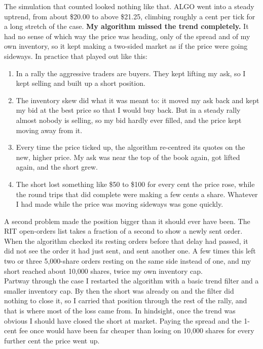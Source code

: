 \documentclass{article}
\begin{document}
\noindent The simulation that counted looked nothing like that. ALGO went into a steady uptrend, from about \$20.00 to above \$21.25, climbing roughly a cent per tick for a long stretch of the case. \textbf{My algorithm missed the trend completely.} It had no sense of which way the price was heading, only of the spread and of my own inventory, so it kept making a two-sided market as if the price were going sideways. In practice that played out like this:
\begin{enumerate}
  \item In a rally the aggressive traders are buyers. They kept lifting my ask, so I kept selling and built up a short position.
  \item The inventory skew did what it was meant to: it moved my ask back and kept my bid at the best price so that I would buy back. But in a steady rally almost nobody is selling, so my bid hardly ever filled, and the price kept moving away from it.
  \item Every time the price ticked up, the algorithm re-centred its quotes on the new, higher price. My ask was near the top of the book again, got lifted again, and the short grew.
  \item The short lost something like \$50 to \$100 for every cent the price rose, while the round trips that did complete were making a few cents a share. Whatever I had made while the price was moving sideways was gone quickly.
\end{enumerate}

\noindent A second problem made the position bigger than it should ever have been. The RIT open-orders list takes a fraction of a second to show a newly sent order. When the algorithm checked its resting orders before that delay had passed, it did not see the order it had just sent, and sent another one. A few times this left two or three 5{,}000-share orders resting on the same side instead of one, and my short reached about 10{,}000 shares, twice my own inventory cap.\\

\noindent Partway through the case I restarted the algorithm with a basic trend filter and a smaller inventory cap. By then the short was already on and the filter did nothing to close it, so I carried that position through the rest of the rally, and that is where most of the loss came from. In hindsight, once the trend was obvious I should have closed the short at market. Paying the spread and the 1-cent fee once would have been far cheaper than losing on 10{,}000 shares for every further cent the price went up.
\end{document}
